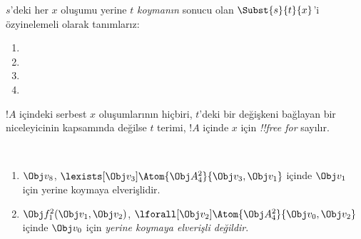 



\begin{defn}
$s$'deki her $x$ oluşumu yerine $t$ \emph{koymanın} sonucu olan
$\Subst{s}{t}{x}$'i özyinelemeli olarak tanımlarız:
\begin{enumerate}
\item {}

\item {}

\item {}

\item{}
\end{enumerate}
\end{defn}

\begin{defn}
$!A$ içindeki serbest $x$ oluşumlarının hiçbiri, $t$'deki bir değişkeni
bağlayan bir niceleyicinin kapsamında değilse $t$ terimi, $!A$ içinde
$x$ için \emph{!!{free for}} sayılır.
\end{defn}

\begin{ex} ~
\begin{enumerate}
\item $\Obj v_8$, $\lexists[\Obj
  v_3]\Atom{\Obj A^2_4}{\Obj v_3,\Obj v_1}$ içinde $\Obj v_1$ için yerine
  koymaya elverişlidir.

\item $\Obj f^2_1(\Obj v_1, \Obj v_2)$, $\lforall[\Obj
  v_2]\Atom{\Obj A^2_4}{\Obj v_0,\Obj v_2}$ içinde $\Obj v_0$ için
  \emph{yerine koymaya elverişli değildir}.
\end{enumerate}
\end{ex}

